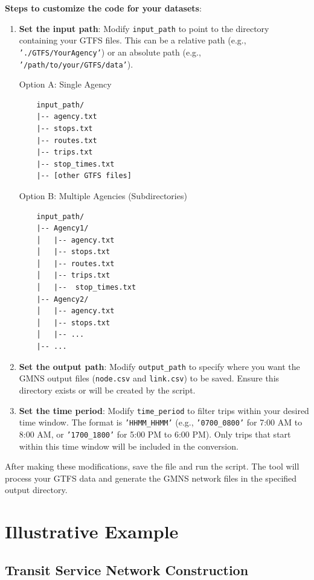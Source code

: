 \documentclass[11pt,a4paper]{article}
\begin{document}
\textbf{Steps to customize the code for your datasets}:

\begin{enumerate}
    \item \textbf{Set the input path}: Modify \texttt{input\_path} to point to the directory containing your GTFS files. This can be a relative path (e.g., \texttt{'./GTFS/YourAgency'}) or an absolute path (e.g., \texttt{'/path/to/your/GTFS/data'}). 
    
    Option A: Single Agency
    \begin{verbatim}
    input_path/
    |-- agency.txt
    |-- stops.txt
    |-- routes.txt
    |-- trips.txt
    |-- stop_times.txt
    |-- [other GTFS files]
    \end{verbatim}
    
    Option B: Multiple Agencies (Subdirectories)
    \begin{verbatim}
    input_path/
    |-- Agency1/
    │   |-- agency.txt
    │   |-- stops.txt
    │   |-- routes.txt
    │   |-- trips.txt
    │   |--  stop_times.txt
    |-- Agency2/
    │   |-- agency.txt
    │   |-- stops.txt
    │   |-- ...
    |-- ...
    \end{verbatim}
    
    \item \textbf{Set the output path}: Modify \texttt{output\_path} to specify where you want the GMNS output files (\texttt{node.csv} and \texttt{link.csv}) to be saved. Ensure this directory exists or will be created by the script.
    
    \item \textbf{Set the time period}: Modify \texttt{time\_period} to filter trips within your desired time window. The format is \texttt{'HHMM\_HHMM'} (e.g., \texttt{'0700\_0800'} for 7:00 AM to 8:00 AM, or \texttt{'1700\_1800'} for 5:00 PM to 6:00 PM). Only trips that start within this time window will be included in the conversion.
\end{enumerate}


After making these modifications, save the file and run the script. The tool will process your GTFS data and generate the GMNS network files in the specified output directory.


\section{Illustrative Example}

\subsection{Transit Service Network Construction}
\end{document}
